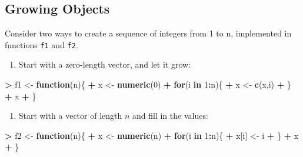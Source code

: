 \documentclass[
]{krantz}
\makeatletter
\newenvironment{Shaded}{\begin{snugshade}}{\end{snugshade}}
\newcommand{\ControlFlowTok}[1]{\textcolor[rgb]{0.27,0.27,0.27}{\textbf{#1}}}
\newcommand{\DecValTok}[1]{\textcolor[rgb]{0.06,0.06,0.06}{#1}}
\newcommand{\KeywordTok}[1]{\textcolor[rgb]{0.27,0.27,0.27}{\textbf{#1}}}
\newcommand{\NormalTok}[1]{#1}
\newcommand{\OperatorTok}[1]{\textcolor[rgb]{0.43,0.43,0.43}{\textbf{#1}}}
\newcommand{\StringTok}[1]{\textcolor[rgb]{0.5,0.5,0.5}{#1}}
\providecommand{\tightlist}{%
  \setlength{\itemsep}{0pt}\setlength{\parskip}{0pt}}
\newenvironment{kframe}{%
\medskip{}
\setlength{\fboxsep}{.8em}
 \def\at@end@of@kframe{}%
 \ifinner\ifhmode%
  \def\at@end@of@kframe{\end{minipage}}%
  \begin{minipage}{\columnwidth}%
 \fi\fi%
 \def\FrameCommand##1{\hskip\@totalleftmargin \hskip-\fboxsep
 \colorbox{shadecolor}{##1}\hskip-\fboxsep
     \hskip-\linewidth \hskip-\@totalleftmargin \hskip\columnwidth}%
 \MakeFramed {\advance\hsize-\width
   \@totalleftmargin\z@ \linewidth\hsize
   \@setminipage}}%
 {\par\unskip\endMakeFramed%
 \at@end@of@kframe}
\renewenvironment{Shaded}{\begin{kframe}}{\end{kframe}}
\makeatother
\begin{document}
\hypertarget{growing-objects}{%
\subsection{Growing Objects}\label{growing-objects}}

Consider two ways to create a sequence of integers from 1 to n, implemented in functions \texttt{f1} and \texttt{f2}.

\begin{enumerate}
\def\labelenumi{\arabic{enumi}.}
\tightlist
\item
  Start with a zero-length vector, and let it grow:
\end{enumerate}

\begin{Shaded}
\begin{Highlighting}[]
\OperatorTok{\textgreater{}}\StringTok{ }\NormalTok{f1 \textless{}{-}}\StringTok{ }\ControlFlowTok{function}\NormalTok{(n)\{}
\OperatorTok{+}\StringTok{     }\NormalTok{x \textless{}{-}}\StringTok{ }\KeywordTok{numeric}\NormalTok{(}\DecValTok{0}\NormalTok{)}
\OperatorTok{+}\StringTok{     }\ControlFlowTok{for}\NormalTok{(i }\ControlFlowTok{in} \DecValTok{1}\OperatorTok{:}\NormalTok{n)\{}
\OperatorTok{+}\StringTok{         }\NormalTok{x \textless{}{-}}\StringTok{ }\KeywordTok{c}\NormalTok{(x,i)}
\OperatorTok{+}\StringTok{     }\NormalTok{\}}
\OperatorTok{+}\StringTok{     }\NormalTok{x}
\OperatorTok{+}\StringTok{ }\NormalTok{\}}
\end{Highlighting}
\end{Shaded}

\begin{enumerate}
\def\labelenumi{\arabic{enumi}.}
\setcounter{enumi}{1}
\tightlist
\item
  Start with a vector of length \(n\) and fill in the values:
\end{enumerate}

\begin{Shaded}
\begin{Highlighting}[]
\OperatorTok{\textgreater{}}\StringTok{ }\NormalTok{f2 \textless{}{-}}\StringTok{ }\ControlFlowTok{function}\NormalTok{(n)\{}
\OperatorTok{+}\StringTok{     }\NormalTok{x \textless{}{-}}\StringTok{ }\KeywordTok{numeric}\NormalTok{(n)}
\OperatorTok{+}\StringTok{     }\ControlFlowTok{for}\NormalTok{(i }\ControlFlowTok{in} \DecValTok{1}\OperatorTok{:}\NormalTok{n)\{}
\OperatorTok{+}\StringTok{         }\NormalTok{x[i] \textless{}{-}}\StringTok{ }\NormalTok{i}
\OperatorTok{+}\StringTok{     }\NormalTok{\}}
\OperatorTok{+}\StringTok{     }\NormalTok{x}
\OperatorTok{+}\StringTok{ }\NormalTok{\}}
\end{Highlighting}
\end{Shaded}
\end{document}
